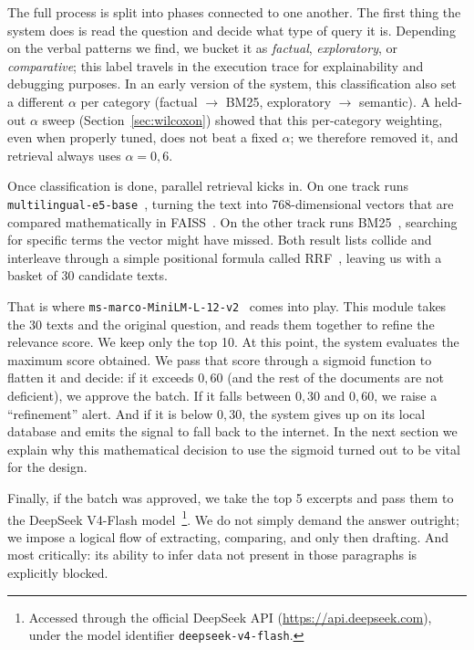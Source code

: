 \documentclass[runningheads]{llncs}
\begin{document}
The full process is split into phases connected to one another. The first thing the system does is read the question and decide what type of query it is. Depending on the verbal patterns we find, we bucket it as \textit{factual}, \textit{exploratory}, or \textit{comparative}; this label travels in the execution trace for explainability and debugging purposes. In an early version of the system, this classification also set a different $\alpha$ per category (factual $\rightarrow$ BM25, exploratory $\rightarrow$ semantic). A held-out $\alpha$ sweep (Section~\ref{sec:wilcoxon}) showed that this per-category weighting, even when properly tuned, does not beat a fixed $\alpha$; we therefore removed it, and retrieval always uses $\alpha{=}0{,}6$.

Once classification is done, parallel retrieval kicks in. On one track runs \texttt{multilingual-e5-base}~\cite{wang2024e5}, turning the text into 768-dimensional vectors that are compared mathematically in FAISS~\cite{johnson2021billion}. On the other track runs BM25~\cite{robertson2009bm25}, searching for specific terms the vector might have missed. Both result lists collide and interleave through a simple positional formula called RRF~\cite{cormack2009rrf}, leaving us with a basket of 30 candidate texts.

That is where \texttt{ms-marco-MiniLM-L-12-v2}~\cite{nogueira2019passage} comes into play. This module takes the 30 texts and the original question, and reads them together to refine the relevance score. We keep only the top 10. At this point, the system evaluates the maximum score obtained. We pass that score through a sigmoid function to flatten it and decide: if it exceeds $0{,}60$ (and the rest of the documents are not deficient), we approve the batch. If it falls between $0{,}30$ and $0{,}60$, we raise a ``refinement'' alert. And if it is below $0{,}30$, the system gives up on its local database and emits the signal to fall back to the internet. In the next section we explain why this mathematical decision to use the sigmoid turned out to be vital for the design.

Finally, if the batch was approved, we take the top 5 excerpts and pass them to the DeepSeek V4-Flash model~\cite{deepseek2026v4}\footnote{Accessed through the official DeepSeek API (\url{https://api.deepseek.com}), under the model identifier \texttt{deepseek-v4-flash}.}. We do not simply demand the answer outright; we impose a logical flow of extracting, comparing, and only then drafting. And most critically: its ability to infer data not present in those paragraphs is explicitly blocked.
\end{document}
